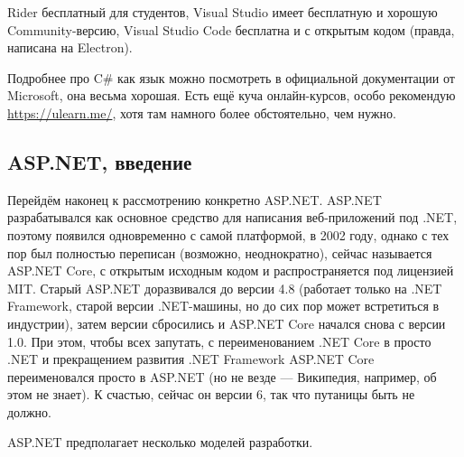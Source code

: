 \documentclass[a5paper]{article}
\begin{document}
Rider бесплатный для студентов, Visual Studio имеет бесплатную и хорошую Community-версию, Visual Studio Code бесплатна и с открытым кодом (правда, написана на Electron).

Подробнее про C\# как язык можно посмотреть в официальной документации от Microsoft, она весьма хорошая. Есть ещё куча онлайн-курсов, особо рекомендую \url{https://ulearn.me/}, хотя там намного более обстоятельно, чем нужно.

\subsection{ASP.NET, введение}

Перейдём наконец к рассмотрению конкретно ASP.NET. ASP.NET разрабатывался как основное средство для написания веб-приложений под .NET, поэтому появился одновременно с самой платформой, в 2002 году, однако с тех пор был полностью переписан (возможно, неоднократно), сейчас называется ASP.NET Core, с открытым исходным кодом и распространяется под лицензией MIT. Старый ASP.NET доразвивался до версии 4.8 (работает только на .NET Framework, старой версии .NET-машины, но до сих пор может встретиться в индустрии), затем версии сбросились и ASP.NET Core начался снова с версии 1.0. При этом, чтобы всех запутать, с переименованием .NET Core в просто .NET и прекращением развития .NET Framework ASP.NET Core переименовался просто в ASP.NET (но не везде --- Википедия, например, об этом не знает). К счастью, сейчас он версии 6, так что путаницы быть не должно.

ASP.NET предполагает несколько моделей разработки.
\end{document}
